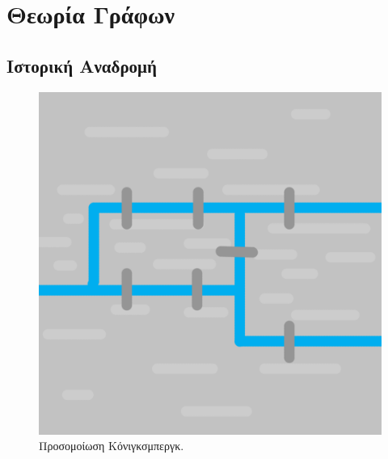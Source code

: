 \section{Θεωρία Γράφων}
\subsection{Ιστορική Αναδρομή}
\begin{figure}[ht]
    \begin{minipage}[c]{.46\linewidth}
        \centering
        \includegraphics[scale=0.15]{2947_thesis/pictures/konigsberg.png}
        \caption{Προσομοίωση Κόνιγκσμπεργκ.}
        \label{1}
    \end{minipage}
    \hfill%
    \begin{minipage}[c]{.46\linewidth}
        \centering

\end{minipage}
\end{figure}
